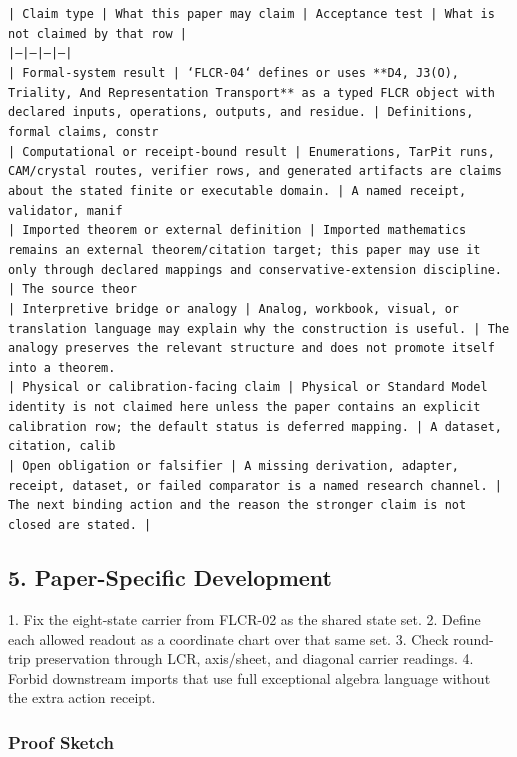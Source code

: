 \documentclass[11pt]{article}
\begin{document}
\noindent\texttt{| Claim type | What this paper may claim | Acceptance test | What is not claimed by that row |}\\
\noindent\texttt{|---|---|---|---|}\\
\noindent\texttt{| Formal-system result | `FLCR-04` defines or uses **D4, J3(O), Triality, And Representation Transport** as a typed FLCR object with declared inputs, operations, outputs, and residue. | Definitions, formal claims, constr}\\
\noindent\texttt{| Computational or receipt-bound result | Enumerations, TarPit runs, CAM/crystal routes, verifier rows, and generated artifacts are claims about the stated finite or executable domain. | A named receipt, validator, manif}\\
\noindent\texttt{| Imported theorem or external definition | Imported mathematics remains an external theorem/citation target; this paper may use it only through declared mappings and conservative-extension discipline. | The source theor}\\
\noindent\texttt{| Interpretive bridge or analogy | Analog, workbook, visual, or translation language may explain why the construction is useful. | The analogy preserves the relevant structure and does not promote itself into a theorem. }\\
\noindent\texttt{| Physical or calibration-facing claim | Physical or Standard Model identity is not claimed here unless the paper contains an explicit calibration row; the default status is deferred mapping. | A dataset, citation, calib}\\
\noindent\texttt{| Open obligation or falsifier | A missing derivation, adapter, receipt, dataset, or failed comparator is a named research channel. | The next binding action and the reason the stronger claim is not closed are stated. | }\\

\subsection*{5. Paper-Specific Development}

1. Fix the eight-state carrier from FLCR-02 as the shared state set.
2. Define each allowed readout as a coordinate chart over that same set.
3. Check round-trip preservation through LCR, axis/sheet, and diagonal carrier readings.
4. Forbid downstream imports that use full exceptional algebra language without the extra action receipt.

\subsubsection*{Proof Sketch}
\end{document}

